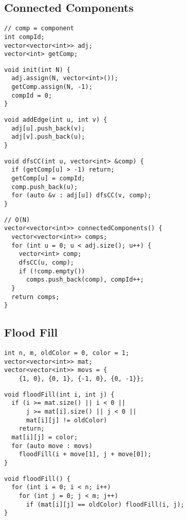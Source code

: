 \documentclass[twoside]{article}
\begin{document}
\begin{multicols*}{2}
\subsectionfont{\large\bfseries\sffamily\underline}
\subsection*{Connected Components}
\begin{verbatim}
// comp = component
int compId;
vector<vector<int>> adj;
vector<int> getComp;
\end{verbatim}
\vspace{-12pt}
\begin{verbatim}
void init(int N) {
  adj.assign(N, vector<int>());
  getComp.assign(N, -1);
  compId = 0;
}
\end{verbatim}
\vspace{-12pt}
\begin{verbatim}
void addEdge(int u, int v) {
  adj[u].push_back(v);
  adj[v].push_back(u);
}
\end{verbatim}
\vspace{-12pt}
\begin{verbatim}
void dfsCC(int u, vector<int> &comp) {
  if (getComp[u] > -1) return;
  getComp[u] = compId;
  comp.push_back(u);
  for (auto &v : adj[u]) dfsCC(v, comp);
}
\end{verbatim}
\vspace{-12pt}
\begin{verbatim}
// O(N)
vector<vector<int>> connectedComponents() {
  vector<vector<int>> comps;
  for (int u = 0; u < adj.size(); u++) {
    vector<int> comp;
    dfsCC(u, comp);
    if (!comp.empty())
      comps.push_back(comp), compId++;
  }
  return comps;
}
\end{verbatim}

\subsectionfont{\large\bfseries\sffamily\underline}
\subsection*{Flood Fill}
\begin{verbatim}
int n, m, oldColor = 0, color = 1;
vector<vector<int>> mat;
vector<vector<int>> movs = {
    {1, 0}, {0, 1}, {-1, 0}, {0, -1}};
\end{verbatim}
\vspace{-12pt}
\begin{verbatim}
void floodFill(int i, int j) {
  if (i >= mat.size() || i < 0 ||
      j >= mat[i].size() || j < 0 ||
      mat[i][j] != oldColor)
    return;
  mat[i][j] = color;
  for (auto move : movs)
    floodFill(i + move[1], j + move[0]);
}
\end{verbatim}
\vspace{-12pt}
\begin{verbatim}
void floodFill() {
  for (int i = 0; i < n; i++)
    for (int j = 0; j < m; j++)
      if (mat[i][j] == oldColor) floodFill(i, j);
}
\end{verbatim}


\end{multicols*}
\end{document}
